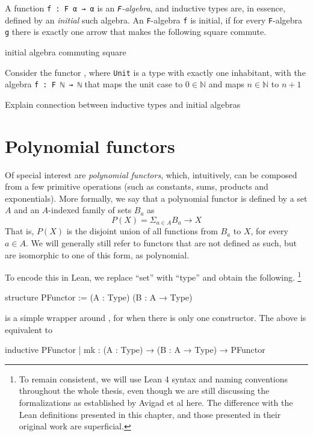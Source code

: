 \documentclass[titlepage]{report}
\newenvironment{remark}[1][Remark:]{\begin{trivlist}                         
    \item[\hskip \labelsep {\bfseries #1}]}{\end{trivlist}}
\newenvironment{todo}[1][Todo:]{\begin{trivlist}                         
    \item[\hskip \labelsep {\bfseries #1}]}{\end{trivlist}}
\newcommand\inductive{\lean{inductive}}
\begin{document}
A function \texttt{f : F α → α} is an \emph{\texttt{F}-algebra}, and inductive types are, in essence, defined by an \emph{initial} such algebra. An \texttt{F}-algebra \texttt{f} is initial, if for every \texttt{F}-algebra \texttt{g} there is exactly one arrow that makes the following square commute.
\begin{todo}
    initial algebra commuting square
\end{todo}

Consider the functor , where \texttt{Unit} is a type with exactly one inhabitant, with the algebra \texttt{f : F ℕ → ℕ} that maps the unit case to $0 ∈ \mathbb{N}$ and maps $n ∈ ℕ$ to $n + 1$

\begin{todo}
    Explain connection between inductive types and initial algebras
\end{todo}





\section{Polynomial functors}
Of special interest are \emph{polynomial functors}, which, intuitively, can be composed from a few primitive operations (such as constants, sums, products and exponentials).
More formally, we say that a polynomial functor is defined by a set $A$ and an $A$-indexed family of sets $B_a$ as
\[
    P(X) = \Sigma_{a ∈ A} B_a \rightarrow X  
\]
That is, $P(X)$ is the disjoint union of all functions from $B_a$ to $X$, for every $a ∈ A$.
We will generally still refer to functors that are not defined as such, but are isomorphic to one of this form, as polynomial.

To encode this in Lean, we replace ``set'' with ``type'' and obtain the following.
\footnote{To remain consistent, we will use Lean 4 syntax and naming conventions throughout the whole thesis, even though we are still discussing the formalizations as established by Avigad et al here. The difference with the Lean definitions presented in this chapter, and those presented in their original work are superficial.}
\begin{leancode}
    structure PFunctor := (A : Type) (B : A → Type)
\end{leancode}

\begin{remark}
     is a simple wrapper around \inductive, for when there is only one constructor.
    The above is equivalent to
    \begin{leancode}
        inductive PFunctor 
        | mk : (A : Type) → (B : A → Type) → PFunctor
    \end{leancode}
\end{remark}
\end{document}
